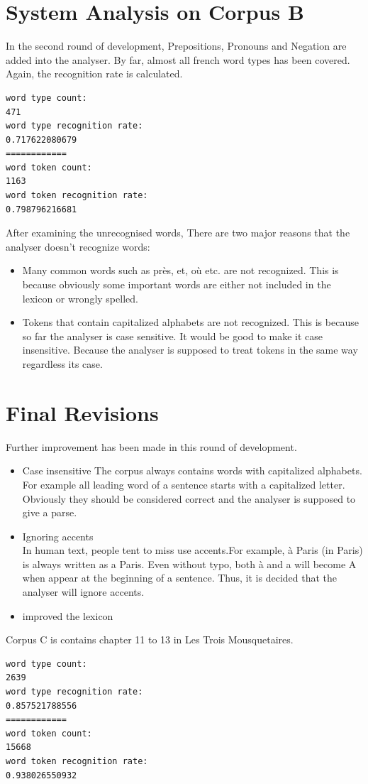 \documentclass[11pt,letterpaper]{article}
\begin{document}
\section{System Analysis on Corpus B}
In the second round of development, Prepositions, Pronouns and Negation are added into the analyser. By far, almost all french word types has been covered. Again, the recognition rate is calculated.\\

\begin{verbatim}
word type count:
471
word type recognition rate:
0.717622080679
============
word token count:
1163
word token recognition rate:
0.798796216681
\end{verbatim} 
After examining the unrecognised words, There are two major reasons that the analyser doesn't recognize words:\\
\begin{itemize}
\item Many common words such as pr\`es, et, o\`u etc. are not recognized. This is because obviously some important words are either not included in the lexicon or wrongly spelled.
\item Tokens that contain capitalized alphabets are not recognized. This is because so far the analyser is case sensitive. It would be good to make it case insensitive. Because the analyser is supposed to treat tokens in the same way regardless its case.
\end{itemize}
\section{Final Revisions}
Further improvement has been made in this round of development.
\begin{itemize}
\item Case insensitive
The corpus always contains words with capitalized alphabets. For example all leading word of a sentence starts with a capitalized letter. Obviously they should be considered correct and the analyser is supposed to give a parse.
\item Ignoring accents\\
In human text, people tent to miss use accents.For example, \`a Paris (in Paris) is always written as a Paris. Even without typo, both \`a and a will become A when appear at the beginning of a sentence. Thus, it is decided that the analyser will ignore accents.
\item improved the lexicon
\end{itemize}
Corpus C is contains chapter 11 to 13 in Les Trois Mousquetaires.\\
\begin{verbatim}
word type count:
2639
word type recognition rate:
0.857521788556
============
word token count:
15668
word token recognition rate:
0.938026550932
\end{verbatim} 
\end{document}
